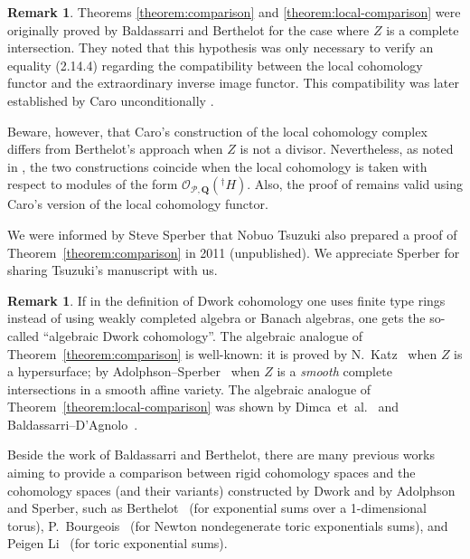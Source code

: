 \documentclass{amsart}
\numberwithin{equation}{section}
\theoremstyle{plain}
\theoremstyle{definition}
\newtheorem{remark}[equation]{Remark}
\renewcommand{\mathbb}{\mathbf}
\begin{document}
\begin{remark}
Theorems \ref{theorem:comparison} and \ref{theorem:local-comparison}
were originally proved by Baldassarri and Berthelot for the case where
\(Z\) is a complete intersection.  They noted
\cite[p.~208, Remark]{baldassarri-berthelot:dwork-cohomology-for-singular-hypersurfaces}
that this hypothesis was only necessary to verify an equality (2.14.4)
regarding the compatibility between the local cohomology functor and
the extraordinary inverse image functor.  This compatibility was later
established by Caro unconditionally
\cite[(2.2.18.1)]{caro:overcoherent-arithmetic-d-modules}.

Beware, however, that Caro's construction of the local cohomology
complex \cite[\S2]{caro:overcoherent-arithmetic-d-modules} differs
from Berthelot's approach when \(Z\) is not a divisor.  Nevertheless,
as noted in
\cite[Remarque~2.2.7]{caro:overcoherent-arithmetic-d-modules}, the two
constructions coincide when the local cohomology is taken with respect
to modules of the form
\(\mathcal{O}_{\mathcal{P},\mathbb{Q}}({}^{\dagger}H)\).  Also, the
proof of
\cite[Theorem~2.14]{baldassarri-berthelot:dwork-cohomology-for-singular-hypersurfaces}
remains valid using Caro's version of the local cohomology functor.

We were informed by Steve Sperber that Nobuo Tsuzuki also prepared a
proof of Theorem~\ref{theorem:comparison} in 2011 (unpublished). We
appreciate Sperber for sharing Tsuzuki's manuscript with us.
\end{remark}


\begin{remark}
If in the definition of Dwork cohomology one uses finite type rings
instead of using weakly completed algebra or Banach algebras, one gets
the so-called ``algebraic Dwork cohomology''.  The algebraic analogue
of Theorem~\ref{theorem:comparison} is well-known: it is proved by
N.~Katz~\cite{katz:differential-equations-satisfied-by-period-matrices}
when \(Z\) is a hypersurface; by
Adolphson--Sperber~\cite[]{adolphson-sperber:dwork-cohomology-affine-complete-intersection}
when \(Z\) is a \emph{smooth} complete intersections in a smooth
affine variety.  The algebraic analogue of Theorem~\ref{theorem:local-comparison} was shown by
Dimca~et~al.~\cite{dimca-maaref-sabbah-saito:dwork-cohomology-and-d-modules}
and
Baldassarri--D'Agnolo~\cite{baldassarri-d-agnolo:dwork-cohomology-algebraic-d-modules}.

Beside the work of Baldassarri and Berthelot, there are many previous
works aiming to provide a comparison between rigid cohomology spaces
and the cohomology spaces (and their variants) constructed by Dwork
and by Adolphson and Sperber, such as
Berthelot~\cite{berthelot:rigid-cohomology-and-dwork-theory-exponential-sums}
(for exponential sums over a 1-dimensional torus),
P.~Bourgeois~\cite[]{bourgeois:vanishing-and-purity-of-rigid-cohomology-assocaited-to-exponential-sums}
(for Newton nondegenerate toric exponentials sums), and Peigen
Li~\cite[]{li_peigen:exponential-sums-and-rigid-cohomology} (for toric
exponential sums).
\end{remark}
\end{document}
